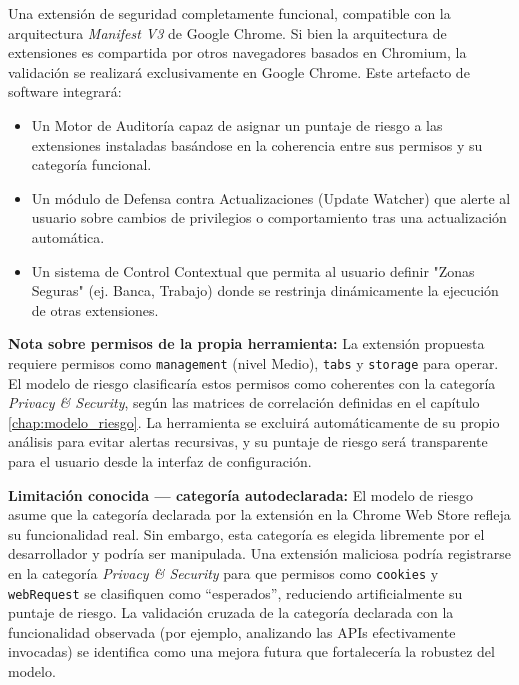 \documentclass[12pt,oneside]{report}
\begin{document}
Una extensión de seguridad completamente funcional, compatible con la arquitectura \textit{Manifest V3} de Google Chrome. Si bien la arquitectura de extensiones es compartida por otros navegadores basados en Chromium, la validación se realizará exclusivamente en Google Chrome. Este artefacto de software integrará:
\begin{itemize}
    \item Un Motor de Auditoría capaz de asignar un puntaje de riesgo a las extensiones instaladas basándose en la coherencia entre sus permisos y su categoría funcional.
    \item Un módulo de Defensa contra Actualizaciones (Update Watcher) que alerte al usuario sobre cambios de privilegios o comportamiento tras una actualización automática.
    \item Un sistema de Control Contextual que permita al usuario definir "Zonas Seguras" (ej. Banca, Trabajo) donde se restrinja dinámicamente la ejecución de otras extensiones.
\end{itemize}

\textbf{Nota sobre permisos de la propia herramienta:} La extensión propuesta requiere permisos como \texttt{management} (nivel Medio), \texttt{tabs} y \texttt{storage} para operar. El modelo de riesgo clasificaría estos permisos como coherentes con la categoría \textit{Privacy \& Security}, según las matrices de correlación definidas en el capítulo \ref{chap:modelo_riesgo}. La herramienta se excluirá automáticamente de su propio análisis para evitar alertas recursivas, y su puntaje de riesgo será transparente para el usuario desde la interfaz de configuración.

\textbf{Limitación conocida --- categoría autodeclarada:} El modelo de riesgo asume que la categoría declarada por la extensión en la Chrome Web Store refleja su funcionalidad real. Sin embargo, esta categoría es elegida libremente por el desarrollador y podría ser manipulada. Una extensión maliciosa podría registrarse en la categoría \textit{Privacy \& Security} para que permisos como \texttt{cookies} y \texttt{webRequest} se clasifiquen como ``esperados'', reduciendo artificialmente su puntaje de riesgo. La validación cruzada de la categoría declarada con la funcionalidad observada (por ejemplo, analizando las APIs efectivamente invocadas) se identifica como una mejora futura que fortalecería la robustez del modelo.
\end{document}
